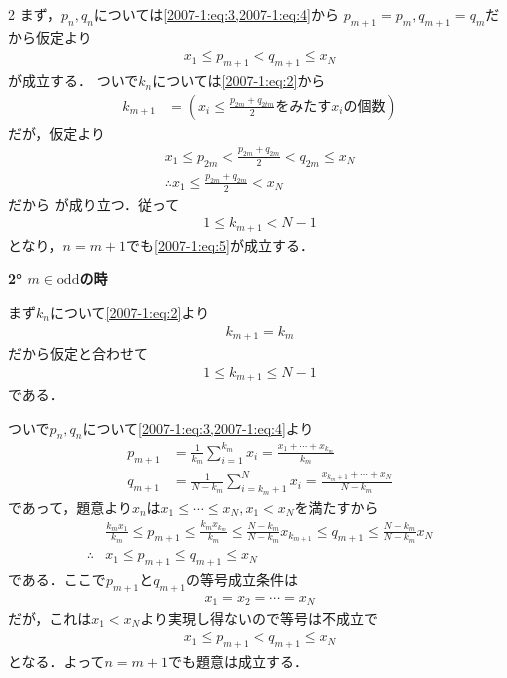 \documentclass[../../../../main.tex]{subfiles}
\begin{document}
\begin{multicols}{2}
  まず，$p_n,q_n$については\cref{2007-1:eq:3,2007-1:eq:4}から
  $p_{m+1} = p_m, q_{m+1} = q_m$だから仮定より
  \begin{align*}
    x_1 \le p_{m+1} < q_{m+1} \le x_N
  \end{align*}
  が成立する．
  ついで$k_n$については\cref{2007-1:eq:2}から
  \begin{align*}
    k_{m+1}
     & = \left( x_i \le \frac{p_{2m}+q_{2tm}}{2} \text{をみたす} x_i \text{の個数} \right)
  \end{align*}
  だが，仮定より
  \begin{align*}
    x_1 \le p_{2m} < \frac{p_{2m}+q_{2m}}{2} < q_{2m} \le x_N \\
    \therefore
    x_1 \le \frac{p_{2m}+q_{2m}}{2} < x_{N}
  \end{align*}
  だから
  が成り立つ．従って
  \begin{align*}
    1 \le k_{m+1} < N-1
  \end{align*}
  となり，$n=m+1$でも\cref{2007-1:eq:5}が成立する．

  \vspace{5pt}
  \textbf{2° $m\in \text{odd}$の時}

  まず$k_n$について\cref{2007-1:eq:2}より
  \begin{align*}
    k_{m+1} = k_{m}
  \end{align*}
  だから仮定と合わせて
  \begin{align*}
    1 \le k_{m+1} \le N-1
  \end{align*}
  である．

  ついで$p_n,q_n$について\cref{2007-1:eq:3,2007-1:eq:4}より
  \begin{align*}
    p_{m+1} & = \frac{1}{k_m}\sum_{i=1}^{k_m}x_i = \frac{x_1+\cdots+x_{k_m}}{k_m}         \\
    q_{m+1} & = \frac{1}{N-k_m}\sum_{i=k_m+1}^{N}x_i = \frac{x_{k_m+1}+\cdots+x_N}{N-k_m}
  \end{align*}
  であって，題意より$x_n$は$x_1 \le \cdots \le x_N, x_1 < x_N$を満たすから
  \begin{align*}
     & \frac{k_m x_1}{k_m} \le p_{m+1} \le \frac{k_m x_{k_m}}{k_m}
    \le \frac{N-k_m}{N-k_m}x_{k_{m+1}} \le q_{m+1} \le \frac{N-k_m}{N-k_m}x_N \\
    \therefore
     & x_1 \le p_{m+1} \le q_{m+1} \le x_N
  \end{align*}
  である．ここで$p_{m+1}$と$q_{m+1}$の等号成立条件は
  \begin{align*}
    x_{1} = x_{2} = \cdots = x_{N}
  \end{align*}
  だが，これは$x_1 < x_N$より実現し得ないので等号は不成立で
  \begin{align*}
    x_1 \le p_{m+1} < q_{m+1} \le x_N
  \end{align*}
  となる．よって$n=m+1$でも題意は成立する．


\end{multicols}
\end{document}
